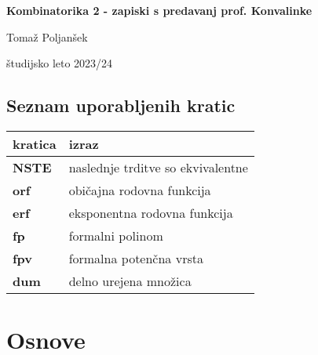 \documentclass[a4paper, 12pt]{book}
\title{\ttitle}
\author{\tauthor}
\date{\tdate}
\newcommand{\ttitle}{Kombinatorika 2 - zapiski s predavanj prof. Konvalinke}
\newcommand{\tauthor}{Tomaž Poljanšek}
\newcommand{\tdate}{študijsko leto 2023/24}
\theoremstyle{definition}
\theoremstyle{remark}
\newcommand\mymaketitle{
  \begin{titlepage}
    \begin{center}
        \vspace*{4cm}
        \Huge
        \textbf{\ttitle}
                        
        \vspace{1.5cm}
        \huge
        \tauthor
            
        \vspace{3cm}
        \Large
        \tdate
    \end{center}
  \end{titlepage}
}
\begin{document}
\renewcommand{\thepage}{}
\newcommand{\sn}[1]{"`#1"'}

\mymaketitle

\clearpage

\frontmatter

\pagestyle{empty}
\def\thepage{}
\tableofcontents{}

\def\x{\hspace{3ex}}    %
\def\y{\hspace{2.45ex}}  %
\def\z{\hspace{1.9ex}}    %
\stackMath

\clearpage
{}

\section*{Seznam uporabljenih kratic}

\noindent\begin{tabular}{p{}|p{}}
  {\bf kratica} & izraz \\ \hline
  {\bf NSTE} & naslednje trditve so ekvivalentne \\
  {\bf orf} & običajna rodovna funkcija \\
  {\bf erf} & eksponentna rodovna funkcija \\
  {\bf fp} & formalni polinom \\
  {\bf fpv} & formalna potenčna vrsta \\
  {\bf dum} & delno urejena množica \\
\end{tabular}




\mainmatter
\setcounter{page}{1}
\pagestyle{fancy}





\chapter{Osnove}
\end{document}
